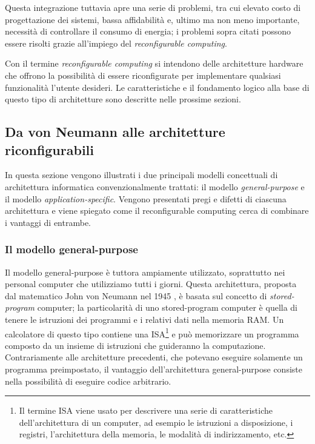Questa integrazione tuttavia apre una serie di problemi, tra cui elevato costo di 
progettazione dei sistemi, bassa affidabilità e, ultimo ma non meno importante,
necessità di controllare il consumo di energia; i problemi sopra citati possono
essere risolti grazie all'impiego del \emph{reconfigurable computing}.

Con il termine \emph{reconfigurable computing} si intendono delle architetture hardware che 
offrono la possibilità di essere riconfigurate per implementare qualsiasi funzionalità 
l'utente desideri. Le caratteristiche e il fondamento logico alla base di questo tipo di 
architetture sono descritte nelle prossime sezioni.

\subsection{Da von Neumann alle architetture riconfigurabili}
\label{subsec:cambioParadigma}
In questa sezione vengono illustrati i due principali modelli concettuali di architettura
informatica convenzionalmente trattati: il modello \emph{general-purpose} e il modello
\emph{application-specific}. Vengono presentati pregi e difetti di ciascuna architettura
e viene spiegato come il reconfigurable computing cerca di combinare i vantaggi di
entrambe.

\subsubsection{Il modello general-purpose}
Il modello general-purpose è tuttora ampiamente utilizzato, soprattutto nei personal
computer che utilizziamo tutti i giorni. Questa architettura, proposta dal matematico
John von Neumann nel 1945 \cite{First-Draft-Report-EDVAC}, è basata sul concetto di
\emph{stored-program} computer; la particolarità di uno stored-program computer è quella
di tenere le istruzioni dei programmi e i relativi dati nella memoria RAM. Un calcolatore di
questo tipo contiene una \ac{ISA}\footnote{Il termine \acl{ISA} viene usato per descrivere
una serie di caratteristiche dell'architettura di un computer, ad esempio le istruzioni
a disposizione, i registri, l'architettura della memoria, le modalità di indirizzamento, etc.}
e può memorizzare un programma composto da un insieme di istruzioni che guideranno
la computazione. Contrariamente alle architetture precedenti, che potevano eseguire
solamente un programma preimpostato, il vantaggio dell'architettura general-purpose consiste
nella possibilità di eseguire codice arbitrario.

